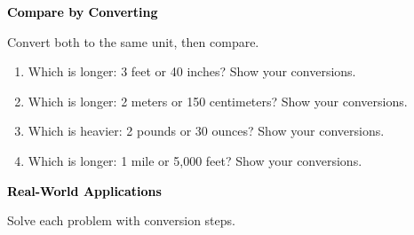 \documentclass[12pt, letterpaper, fleqn]{article}
\begin{document}
\newpage

\begin{tcolorbox}[colback=customteal!20]
\large\textcolor{black}{\textbf{Compare by Converting}}
\end{tcolorbox}

\noindent
Convert both to the same unit, then compare.

\vspace{3mm}

\begin{enumerate}[itemsep=1.8cm, leftmargin=0.6cm]

\item Which is longer: 3 feet or 40 inches? Show your conversions.

\vspace{1.5cm}

\item Which is longer: 2 meters or 150 centimeters? Show your conversions.

\vspace{1.5cm}

\item Which is heavier: 2 pounds or 30 ounces? Show your conversions.

\vspace{1.5cm}

\item Which is longer: 1 mile or 5,000 feet? Show your conversions.

\vspace{1.5cm}

\end{enumerate}

\newpage

\begin{tcolorbox}[colback=customteal!20]
\large\textcolor{black}{\textbf{Real-World Applications}}
\end{tcolorbox}

\noindent
Solve each problem with conversion steps.

\vspace{3mm}
\end{document}
